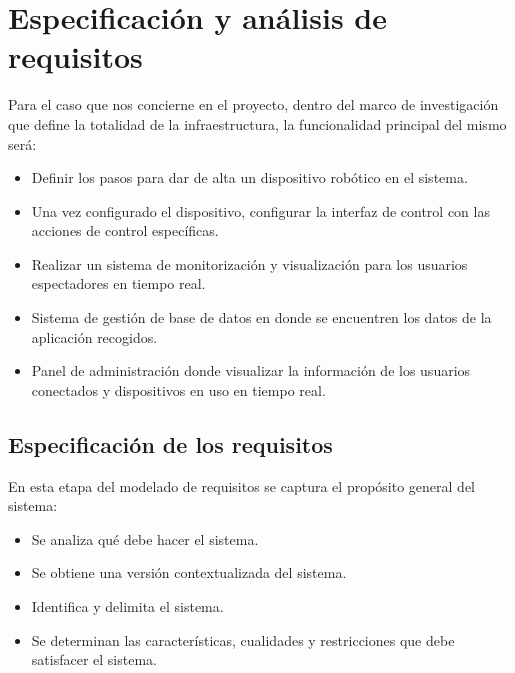 

\chapter[Requisitos]{Especificación y análisis de requisitos}
\label{chap:requisitos}

Para el caso que nos concierne en el proyecto, dentro del marco de investigación que define la totalidad de la infraestructura, la funcionalidad principal del mismo será:

\begin{itemize}
\item Definir los pasos para dar de alta un dispositivo robótico en el sistema.
\item Una vez configurado el dispositivo, configurar la interfaz de control con las acciones de control específicas.
\item Realizar un sistema de monitorización y visualización para los usuarios espectadores en tiempo real.
\item Sistema de gestión de base de datos en donde se encuentren los datos de la aplicación recogidos.
\item Panel de administración donde visualizar la información de los usuarios conectados y dispositivos en uso en tiempo real.
\end{itemize}

\section[Especificación]{Especificación de los requisitos}

En esta etapa del modelado de requisitos se captura el propósito general del sistema:

\begin{itemize}
\item Se analiza qué debe hacer el sistema.
\item Se obtiene una versión contextualizada del sistema.
\item Identifica y delimita el sistema.
\item Se determinan las características, cualidades y restricciones que debe satisfacer el sistema.
\end{itemize}

